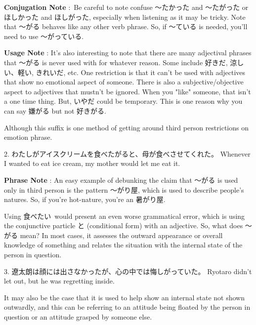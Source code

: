\par{\textbf{Conjugation Note }: Be careful to note confuse ～たかった and ～たがった or ほしかった and ほしがった, especially when listening as it may be tricky. Note that ～がる behaves like any other verb phrase. So, if ～ている is needed, you'll need to use ～がっている. }

\par{\textbf{Usage Note }: It's also interesting to note that there are many adjectival phrases that ～がる is never used with for whatever reason. Some include 好きだ, 涼しい、軽い, きれいだ, etc. One restriction is that it can't be used with adjectives that show no emotional aspect of someone. There is also a subjective\slash objective aspect to adjectives that mustn't be ignored. When you "like" someone, that isn't a one time thing. But, いやだ could be temporary. This is one reason why you can say 嫌がる but not 好きがる. }

\par{ Although this suffix is one method of getting around third person restrictions on emotion phrase. }

\par{2. わたしがアイスクリームを食べたがると、母が食べさせてくれた。 \hfill\break
Whenever I wanted to eat ice cream, my mother would let me eat it. }

\par{\textbf{Phrase Note }: An easy example of debunking the claim that ～がる is used only in third person is the pattern ～がり屋, which is used to describe people's natures. So, if you're hot-nature, you're an 暑がり屋. }

\par{ Using 食べたい would present an even worse grammatical error, which is using the conjunctive particle と (conditional form) with an adjective. So, what does ～がる mean? In most cases, it assesses the outward appearance or overall knowledge of something and relates the situation with the internal state of the person in question. }

\par{3. 遼太朗は顔には出さなかったが、心の中では悔しがっていた。 \hfill\break
Ryotaro didn't let out, but he was regretting inside. }

\par{ It may also be the case that it is used to help show an internal state not shown outwardly, and this can be referring to an attitude being floated by the person in question or an attitude grasped by someone else. }

